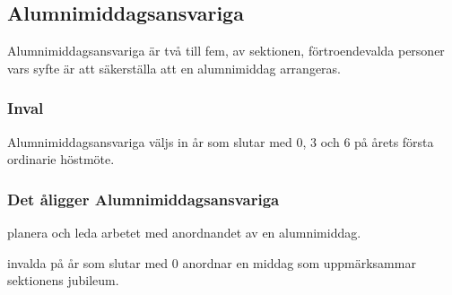 \subsection{Alumnimiddagsansvariga}
Alumnimiddagsansvariga är två till fem, av sektionen, förtroendevalda personer vars syfte är att säkerställa att en alumnimiddag arrangeras.

\subsubsection{Inval}
Alumnimiddagsansvariga väljs in år som slutar med 0, 3 och 6 på årets första ordinarie höstmöte.

\subsubsection{Det åligger Alumnimiddagsansvariga}
\begin{att}
  \item planera och leda arbetet med anordnandet av en alumnimiddag.
  \item invalda på år som slutar med 0 anordnar en middag som uppmärksammar sektionens jubileum.
\end{att}